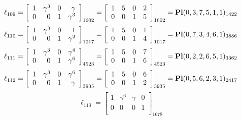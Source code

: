 \documentclass{article}
\begin{document}
{$$
\ell_{109} = 
\left[
\begin{array}{*{4}{r}}
1 & \gamma^{3} & 0 & \gamma \\
0 & 0 & 1 & \gamma^{3}\\
\end{array}
\right]
_{1602}
=
\left[
\begin{array}{*{4}c}
1  & 5  & 0  & 2\\
0  & 0  & 1  & 5\\
\end{array}
\right]_{1602}
={\rm\bf Pl}(0,3,7,5,1,1 )_{1422}$$
$$
\ell_{110} = 
\left[
\begin{array}{*{4}{r}}
1 & \gamma^{3} & 0 & 1\\
0 & 0 & 1 & \gamma^{2}\\
\end{array}
\right]
_{1017}
=
\left[
\begin{array}{*{4}c}
1  & 5  & 0  & 1\\
0  & 0  & 1  & 4\\
\end{array}
\right]_{1017}
={\rm\bf Pl}(0,7,3,4,6,1 )_{3886}$$
$$
\ell_{111} = 
\left[
\begin{array}{*{4}{r}}
1 & \gamma^{3} & 0 & \gamma^{4}\\
0 & 0 & 1 & \gamma^{6}\\
\end{array}
\right]
_{4523}
=
\left[
\begin{array}{*{4}c}
1  & 5  & 0  & 7\\
0  & 0  & 1  & 6\\
\end{array}
\right]_{4523}
={\rm\bf Pl}(0,2,2,6,5,1 )_{3362}$$
$$
\ell_{112} = 
\left[
\begin{array}{*{4}{r}}
1 & \gamma^{3} & 0 & \gamma^{6}\\
0 & 0 & 1 & \gamma \\
\end{array}
\right]
_{3935}
=
\left[
\begin{array}{*{4}c}
1  & 5  & 0  & 6\\
0  & 0  & 1  & 2\\
\end{array}
\right]_{3935}
={\rm\bf Pl}(0,5,6,2,3,1 )_{2417}$$
$$
\ell_{113} = 
\left[
\begin{array}{*{4}{r}}
1 & \gamma^{6} & \gamma  & 0\\
0 & 0 & 0 & 1\\
\end{array}
\right]
_{1678}
$$}
\end{document}
